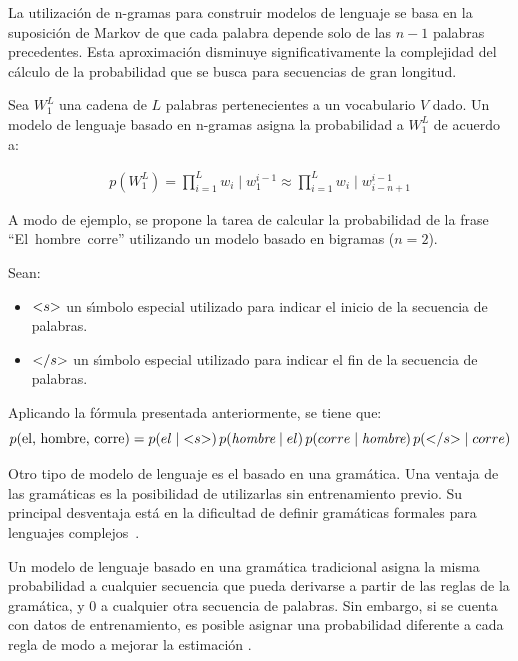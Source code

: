 La utilizaci\'on de n-gramas para construir modelos de lenguaje se basa en la suposici\'on de Markov de que cada
palabra depende solo de las $n - 1$ palabras precedentes. Esta aproximaci\'on disminuye significativamente la
complejidad del c\'alculo de la probabilidad que se busca para secuencias de gran longitud.


Sea $W^L_1$ una cadena de $L $ palabras pertenecientes a un vocabulario $V$ dado. 
Un modelo de lenguaje basado en n-gramas asigna la probabilidad a $W^L_1$ de acuerdo a:

\begin{align}
p(W^L_1) = \displaystyle \prod^L_{i = 1} w_i \mid w^{i - 1}_1 \approx \displaystyle \prod^L_{i = 1} w_i \mid w^{i - 1}_{i - n + 1}
\end{align}

A modo de ejemplo, se propone la tarea de calcular la probabilidad de la frase \mbox{``El hombre corre''}
utilizando un modelo basado en bigramas ($n=2$).

Sean:
\begin{itemize}
 	\item $\text{\textless} s\text{\textgreater}$ un s{\'\i}mbolo especial utilizado para indicar 
 	el inicio de la secuencia de palabras.
  	\item $\text{\textless} /s\text{\textgreater}$ un s{\'\i}mbolo especial utilizado para indicar el fin 
  	de la secuencia de palabras.
\end{itemize} 

Aplicando la f\'ormula presentada anteriormente, se tiene que:
\begin{equation*}
p(\text{el, hombre, corre}) = p(el \mid \text{\textless} s\text{\textgreater}) \, 
p(\emph{\text{hombre}} \mid el) \, p(corre \mid \emph{\text{hombre}}) \, 
p(\text{\textless} /s\text{\textgreater} \mid corre)
\end{equation*}


Otro tipo de modelo de lenguaje es el basado en una gram\'atica. Una ventaja de las gram\'aticas es la
posibilidad de utilizarlas sin entrenamiento previo. Su principal desventaja est\'a en la dificultad de
definir gram\'aticas formales para lenguajes \mbox{complejos \cite{Wang2000}}.

Un modelo de lenguaje basado en una gram\'atica tradicional asigna la misma probabilidad a 
cualquier secuencia que pueda derivarse a partir de las reglas de la gram\'atica, y 0
a cualquier otra secuencia de palabras.
Sin embargo, si se cuenta con datos de entrenamiento, es posible asignar una probabilidad
diferente a cada regla de modo a mejorar la estimaci\'on \cite{huang-handbook10}.

